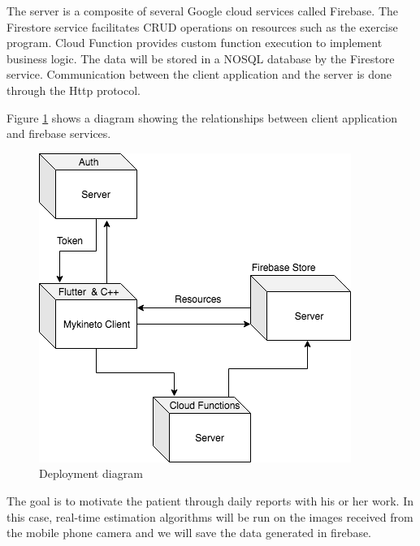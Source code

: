 
The server is a composite of several Google cloud services called Firebase. The Firestore service facilitates CRUD operations on resources such as the exercise program. Cloud Function provides custom function execution to implement business logic. The data will be stored in a NOSQL database by the Firestore service. Communication between the client application and the server is done through the Http protocol.


 Figure \ref{fig:uml-client-server} shows a diagram showing the relationships between client application and firebase services.
 
 \begin{figure}[htbp]
	\centerline{\includegraphics[scale=0.7]{fig/client-server.png}}  
	\caption{Deployment diagram}
	\label{fig:uml-client-server}
\end{figure}

The goal is to motivate the patient through daily reports with his or her work.
In this case, real-time estimation algorithms will be run on the images received from the mobile phone camera and we will save the data generated in firebase.

